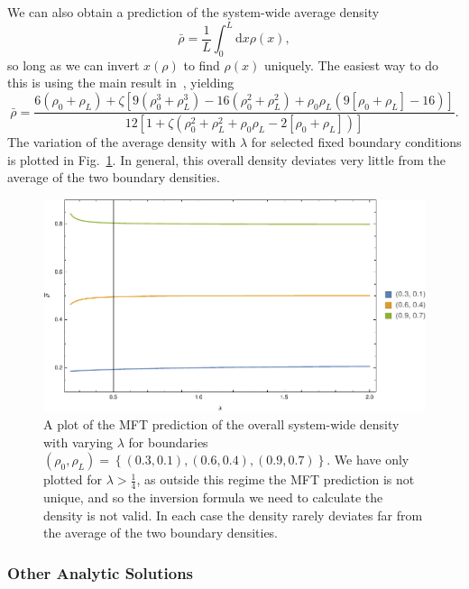 We can also obtain a prediction of the system-wide average density
\begin{equation}
 \bar{\rho} = \frac{1}{L} \int_0^L  \! \! \mathrm{d}x \rho(x),
\end{equation}
so long as we can invert $x(\rho)$ to find $\rho(x)$ uniquely. The easiest way to do this is using the main result in~\cite{laisant1905}, yielding
\begin{equation}
 \bar{\rho} = \frac{6 (\rho_0 + \rho_L) + \zeta \left[9 \left( \rho_0^3 + \rho_L^3\right) - 16 \left( \rho_0^2 + \rho_L^2 \right) + \rho_0\rho_L\left( 9\left[ \rho_0 + \rho_L \right] - 16  \right)  \right]}{12 \left[ 1 + 
  \zeta \left( \rho_0^2 + \rho_L^2 + \rho_0 \rho_L - 2 \left[ \rho_0+\rho_L \right] \right) \right]}.
\end{equation}
The variation of the average density with $\lambda$ for selected fixed boundary conditions is plotted in Fig.~\ref{fig:mftDens}. In general, this overall density deviates very little from the average of the two boundary densities.
\begin{figure}[h!]
 \caption[The variation of the system-wide average density with respect to $\lambda$ in the MFT, with fixed boundary densities.]{\label{fig:mftDens} 
 A plot of the MFT prediction of the overall system-wide density with varying $\lambda$ for boundaries $(\rho_0, \rho_L) = \left\lbrace (0.3, 0.1), (0.6, 0.4), (0.9, 0.7) \right\rbrace$.
 We have only plotted for $\lambda>\frac{1}{4}$, as outside this regime the MFT prediction is not unique, and so the inversion formula we need to calculate the density is not valid. In each case the density rarely deviates far from
 the average of the two boundary densities.}
 \includegraphics[width=0.99\linewidth]{analytics/images/mftDensity1d}
\end{figure}

\subsubsection{Other Analytic Solutions}

